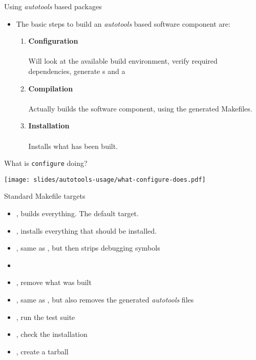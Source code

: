\begin{frame}{Using {\em autotools} based packages}
  \begin{itemize}
  \item The basic steps to build an {\em autotools} based software
    component are:
    \begin{enumerate}
    \item {\bf Configuration}\\
      \\
      Will look at the available build environment, verify required
      dependencies, generate s and a 
    \item {\bf Compilation}\\
      \\
      Actually builds the software component, using the generated
      Makefiles.
    \item {\bf Installation}\\
      \\
      Installs what has been built.
    \end{enumerate}
  \end{itemize}
\end{frame}

\begin{frame}{What is {\tt configure} doing?}
  \begin{center}
    \texttt{[image: slides/autotools-usage/what-configure-does.pdf]}
  \end{center}
\end{frame}

\begin{frame}{Standard Makefile targets}
  \begin{itemize}
  \item {}, builds everything. The default target.
  \item {}, installs everything that should be installed.
  \item {}, same as , but then strips
    debugging symbols
  \item {}
  \item {}, remove what was built
  \item {}, same as , but also removes the
    generated {\em autotools} files
  \item {}, run the test suite
  \item {}, check the installation
  \item {}, create a tarball
  \end{itemize}
\end{frame}

